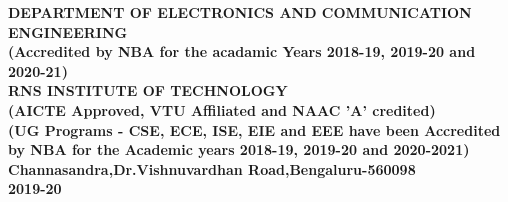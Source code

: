 \begin{titlingpage}
\begin{center}
\small\textbf{DEPARTMENT OF ELECTRONICS AND COMMUNICATION ENGINEERING\\
(Accredited by NBA for the acadamic Years 2018-19, 2019-20 and 2020-21)
\\
\vspace{0.5cm}
RNS INSTITUTE OF TECHNOLOGY\\
(AICTE Approved, VTU Affiliated and NAAC 'A' credited)\\
(UG Programs - CSE, ECE, ISE, EIE and EEE have been Accredited by NBA for the Academic years 2018-19, 2019-20 and 2020-2021)\\
Channasandra,Dr.Vishnuvardhan Road,Bengaluru-560098\\
	 2019-20
}

\end{center}
\end{titlingpage}
